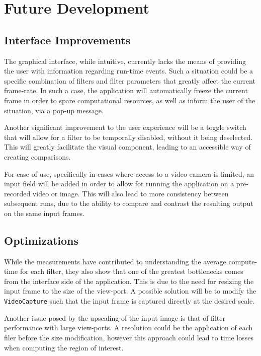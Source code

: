 \chapter{Future Development}

\section{Interface Improvements}

The graphical interface, while intuitive, currently lacks the means of providing the user with information
regarding run-time events. Such a situation could be a specific combination of filters and filter parameters
that greatly affect the current frame-rate. In such a case, the application will automatically freeze
the current frame in order to spare computational resources, as well as inform the user of the situation,
via a pop-up message.

Another significant improvement to the user experience will be a toggle switch that will allow for a filter
to be temporally disabled, without it being deselected. This will greatly facilitate the visual component,
leading to an accessible way of creating comparisons.

For ease of use, specifically in cases where access to a video camera is limited, an input field will be 
added in order to allow for running the application on a pre-recorded video or image. This will also lead
to more consistency between subsequent runs, due to the ability to compare and contrast the resulting 
output on the same input frames.

\section{Optimizations}

While the measurements have contributed to understanding the average compute-time for each filter, they
also show that one of the greatest bottlenecks comes from the interface side of the application. This is 
due to the need for resizing the input frame to the size of the view-port. A possible solution will be 
to modify the \verb|VideoCapture| such that the input frame is captured directly at the desired scale.

Another issue posed by the upscaling of the input image is that of filter performance with large
view-ports. A resolution could be the application of each filer before the size modification, however
this approach could lead to time losses when computing the region of interest.

